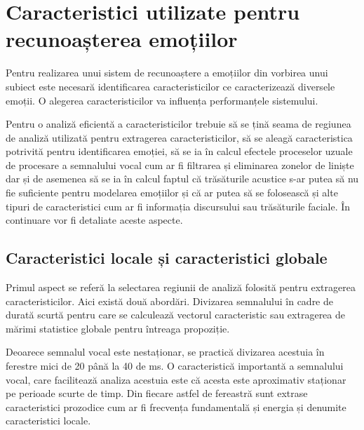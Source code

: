 \documentclass[9pt,shortpaper,twoside,web]{ieeecolor}
\begin{document}
\section{Caracteristici utilizate pentru recunoașterea emoțiilor}
Pentru realizarea unui sistem de recunoaștere a emoțiilor din vorbirea unui subiect este necesară identificarea caracteristicilor ce caracterizează diversele emoții. O alegerea caracteristicilor va influența performanțele sistemului.

Pentru o analiză eficientă a caracteristicilor trebuie să se țină seama de regiunea de analiză utilizată pentru extragerea caracteristicilor, să se aleagă caracteristica potrivită pentru identificarea emoției, să se ia în calcul efectele proceselor uzuale de procesare a semnalului vocal cum ar fi filtrarea și eliminarea zonelor de liniște dar și de asemenea să se ia în calcul faptul că trăsăturile acustice s-ar putea să nu fie suficiente pentru modelarea emoțiilor și că ar putea să se folosească și alte tipuri de caracteristici cum ar fi informația discursului sau trăsăturile faciale. În continuare vor fi detaliate aceste aspecte.


\subsection{Caracteristici locale și caracteristici globale}
Primul aspect se referă la selectarea regiunii de analiză folosită pentru extragerea caracteristicilor. Aici există două abordări. Divizarea semnalului în cadre de durată scurtă pentru care se calculează vectorul caracteristic sau extragerea de mărimi statistice globale pentru întreaga propoziție. 

Deoarece semnalul vocal este nestaționar, se practică divizarea acestuia în ferestre mici de 20 până la 40 de ms. O caracteristică importantă a semnalului vocal, care facilitează analiza acestuia este că acesta este aproximativ staționar pe perioade scurte de timp. Din fiecare astfel de fereastră sunt extrase caracteristici prozodice cum ar fi frecvența fundamentală și energia și denumite caracteristici locale. 
\end{document}
